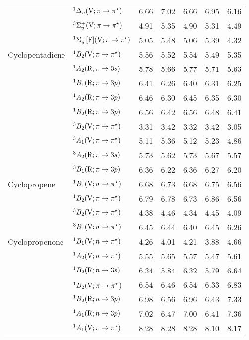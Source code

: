 \begin{tabular}{p{3.5cm}p{3.3cm}c|cccc}
        & $^1\Delta_u (\mathrm{V}; \pi \rightarrow \pi^\star)$ 			& 6.66 	&7.02	&6.66	&6.95	&6.16\\
        & $^3\Sigma_u^+ (\mathrm{V}; \pi \rightarrow \pi^\star)$ 			& 4.91	&5.35	&4.90	&5.31	&4.49\\
        & $^1\Sigma_u^-  [\mathrm{F}]  (\mathrm{V}; \pi \rightarrow \pi^\star)$		& 5.05 	&5.48	&5.06	&5.39	&4.32\\
  Cyclopentadiene&$^1B_2 (\mathrm{V}; \pi \rightarrow \pi^\star)$	 			& 5.56	&5.52	&5.54	&5.49	&5.35\\
        &$^1A_2 (\mathrm{R}; \pi \rightarrow 3s)$			 	& 5.78	&5.66	&5.77	&5.71	&5.63\\
        &$^1B_1  (\mathrm{R}; \pi \rightarrow 3p)$			 	& 6.41	&6.26	&6.40	&6.31	&6.25\\
        &$^1A_2  (\mathrm{R}; \pi \rightarrow 3p)$			 	& 6.46	&6.30	&6.45	&6.35	&6.30\\
        &$^1B_2  (\mathrm{R}; \pi \rightarrow 3p)$			 	& 6.56	&6.42	&6.56	&6.48	&6.41\\
        &$^3B_2 (\mathrm{V}; \pi \rightarrow \pi^\star)$		 		& 3.31	&3.42	&3.32	&3.42	&3.05\\
        &$^3A_1 (\mathrm{V}; \pi \rightarrow \pi^\star)$		 		& 5.11	&5.36	&5.12	&5.23	&4.86\\
        &$^3A_2 (\mathrm{R}; \pi \rightarrow 3s)$			 	& 5.73	&5.62	&5.73	&5.67	&5.57\\
        &$^3B_1 (\mathrm{R}; \pi \rightarrow 3p)$			 	& 6.36	&6.22	&6.36	&6.27	&6.20\\ 	
  Cyclopropene	&$^1B_1 (\mathrm{V};\sigma \rightarrow \pi^\star)$				&6.68	&6.73	&6.68	&6.75	&6.56	\\
        &$^1B_2 (\mathrm{V};\pi \rightarrow \pi^\star)$				&6.79	&6.78	&6.73	&6.86	&6.56	\\
        &$^3B_2 (\mathrm{V};\pi \rightarrow \pi^\star)$				&4.38	&4.46	&4.34	&4.45	&4.09 	\\
        &$^3B_1 (\mathrm{V};\sigma \rightarrow \pi^\star)$				&6.45	&6.44	&6.40	&6.45	&6.26 	\\
  Cyclopropenone&$^1B_1 (\mathrm{V}; n \rightarrow \pi^\star)$				& 4.26 	&4.01	&4.21	&3.88	&4.66\\ 	
        &$^1A_2 (\mathrm{V}; n \rightarrow \pi^\star)$					& 5.55	&5.65	&5.57	&5.47	&5.61\\ 	
        &$^1B_2 (\mathrm{R}; n \rightarrow 3s)$					& 6.34	&5.84	&6.32	&5.79	&6.64\\ 	
        &$^1B_2 (\mathrm{V}; \pi \rightarrow \pi^\star$)				& 6.54	&6.46	&6.54	&6.33	&6.83\\ 	
        &$^1B_2 (\mathrm{R}; n \rightarrow 3p)$					& 6.98	&6.56	&6.96	&6.43	&7.33\\ 	
        &$^1A_1 (\mathrm{R}; n \rightarrow 3p)$					& 7.02	&6.47	&7.00	&6.41	&7.36\\ 	
        &$^1A_1 (\mathrm{V}; \pi \rightarrow \pi^\star)$				& 8.28	&8.28	&8.28	&8.10	&8.17\\ 	

\end{tabular}
